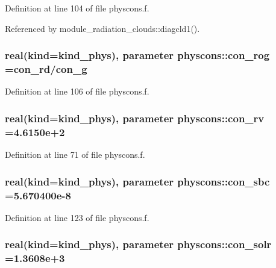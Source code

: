 Definition at line 104 of file physcons.\+f.



Referenced by module\+\_\+radiation\+\_\+clouds\+::diagcld1().

\subsubsection[{\texorpdfstring{con\+\_\+rog}{con_rog}}]{\setlength{\rightskip}{0pt plus 5cm}real(kind=kind\+\_\+phys), parameter physcons\+::con\+\_\+rog ={\bf con\+\_\+rd}/{\bf con\+\_\+g}}\hypertarget{namespacephyscons_af9c8d062e83de66ed309224af5644450}{}\label{namespacephyscons_af9c8d062e83de66ed309224af5644450}


Definition at line 106 of file physcons.\+f.

\subsubsection[{\texorpdfstring{con\+\_\+rv}{con_rv}}]{\setlength{\rightskip}{0pt plus 5cm}real(kind=kind\+\_\+phys), parameter physcons\+::con\+\_\+rv =4.\+6150e+2}\hypertarget{namespacephyscons_a3ae962da4c7a9cb83c4a2abe743696b0}{}\label{namespacephyscons_a3ae962da4c7a9cb83c4a2abe743696b0}


Definition at line 71 of file physcons.\+f.

\subsubsection[{\texorpdfstring{con\+\_\+sbc}{con_sbc}}]{\setlength{\rightskip}{0pt plus 5cm}real(kind=kind\+\_\+phys), parameter physcons\+::con\+\_\+sbc =5.\+670400e-\/8}\hypertarget{namespacephyscons_ad90a38d35e6d071f7679f6c0a6f6aee1}{}\label{namespacephyscons_ad90a38d35e6d071f7679f6c0a6f6aee1}


Definition at line 123 of file physcons.\+f.

\subsubsection[{\texorpdfstring{con\+\_\+solr}{con_solr}}]{\setlength{\rightskip}{0pt plus 5cm}real(kind=kind\+\_\+phys), parameter physcons\+::con\+\_\+solr =1.\+3608e+3}\hypertarget{namespacephyscons_a146fd04a08d9f5fac3389f105fd81c23}{}\label{namespacephyscons_a146fd04a08d9f5fac3389f105fd81c23}


